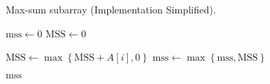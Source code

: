 
\begin{algorithm}[H]
  \caption{Max-sum subarray (Implementation Simplified).}
  \label{alg:mss}
  \begin{algorithmic}[1]
      \State $\text{mss} \gets 0$
      \State $\text{MSS} \gets 0$

      \hStatex
	\State $\text{MSS} \gets \max\left\{\text{MSS} + A[i], 0\right\}$
	\State $\text{mss} \gets \max\left\{\text{mss}, \text{MSS}\right\}$
      \EndFor

      \hStatex
      \State \Return $\text{mss}$
    \EndProcedure
  \end{algorithmic}
\end{algorithm}

